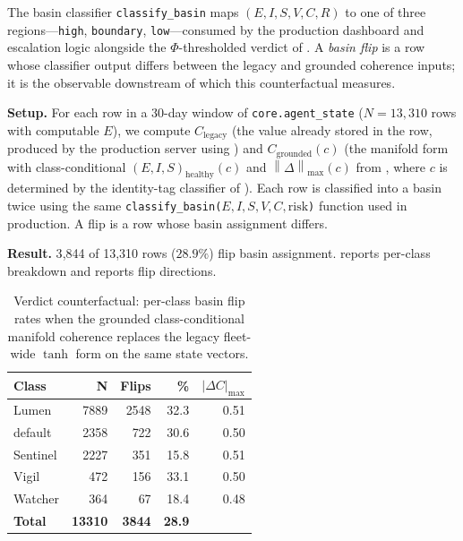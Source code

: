 \documentclass[11pt,twocolumn]{article}
\newcommand{\norm}[1]{\left\lVert #1 \right\rVert}
\begin{document}
The basin classifier \texttt{classify\_basin} maps
$(E,I,S,V,C,R)$ to one of three regions---\texttt{high},
\texttt{boundary}, \texttt{low}---consumed by the production
dashboard and escalation logic alongside the
$\Phi$-thresholded verdict of . A
\emph{basin flip} is a row whose classifier output differs
between the legacy and grounded coherence inputs; it is the
observable downstream of which this counterfactual measures.

\textbf{Setup.} For each row in a $30$-day window of
\texttt{core.agent\_state} ($N = 13{,}310$ rows with computable
$E$), we compute $C_{\text{legacy}}$ (the value already stored in
the row, produced by the production server using
) and $C_{\text{grounded}}(c)$ (the manifold
form  with class-conditional
$(E,I,S)_{\text{healthy}}(c)$ and $\norm{\Delta}_{\max}(c)$ from
, where $c$ is determined by the identity-tag
classifier of ). Each row is classified
into a basin twice using the same
\texttt{classify\_basin($E,I,S,V,C,\text{risk}$)} function used
in production. A flip is a row whose basin assignment differs.

\textbf{Result.} 3{,}844 of 13{,}310 rows ($28.9\%$) flip basin
assignment.  reports per-class breakdown
and  reports flip directions.

\begin{table}[t]
\centering\small
\caption{Verdict counterfactual: per-class basin flip rates when the
grounded class-conditional manifold coherence replaces the legacy
fleet-wide $\tanh$ form on the same state vectors.}
\label{tab:counterfactual}
\begin{tabular}{@{}lrrrr@{}}
\toprule
\textbf{Class} & \textbf{N} & \textbf{Flips} & \textbf{\%} & $|\Delta C|_{\max}$ \\
\midrule
Lumen     & 7889 & 2548 & 32.3 & 0.51 \\
default   & 2358 &  722 & 30.6 & 0.50 \\
Sentinel  & 2227 &  351 & 15.8 & 0.51 \\
Vigil     &  472 &  156 & 33.1 & 0.50 \\
Watcher   &  364 &   67 & 18.4 & 0.48 \\
\midrule
\textbf{Total} & \textbf{13310} & \textbf{3844} & \textbf{28.9} & \\
\bottomrule
\end{tabular}
\end{table}
\end{document}
